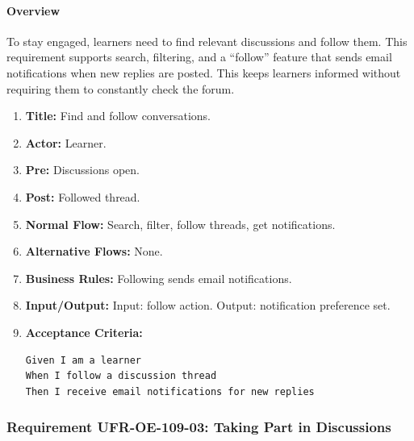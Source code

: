 \paragraph{Overview}
To stay engaged, learners need to find relevant discussions and follow them. This requirement supports search, filtering, and a “follow” feature that sends email notifications when new replies are posted. This keeps learners informed without requiring them to constantly check the forum.
\begin{enumerate}[label=\textbf{\arabic*.}]
\item \textbf{Title:} Find and follow conversations.
\item \textbf{Actor:} Learner.
\item \textbf{Pre:} Discussions open.
\item \textbf{Post:} Followed thread.
\item \textbf{Normal Flow:} Search, filter, follow threads, get notifications.
\item \textbf{Alternative Flows:} None.
\item \textbf{Business Rules:} Following sends email notifications.
\item \textbf{Input/Output:} Input: follow action. Output: notification preference set.
\item \textbf{Acceptance Criteria:}
    \begin{verbatim}
Given I am a learner
When I follow a discussion thread
Then I receive email notifications for new replies
    \end{verbatim}
\end{enumerate}

\subsubsection{Requirement UFR-OE-109-03: Taking Part in Discussions}
